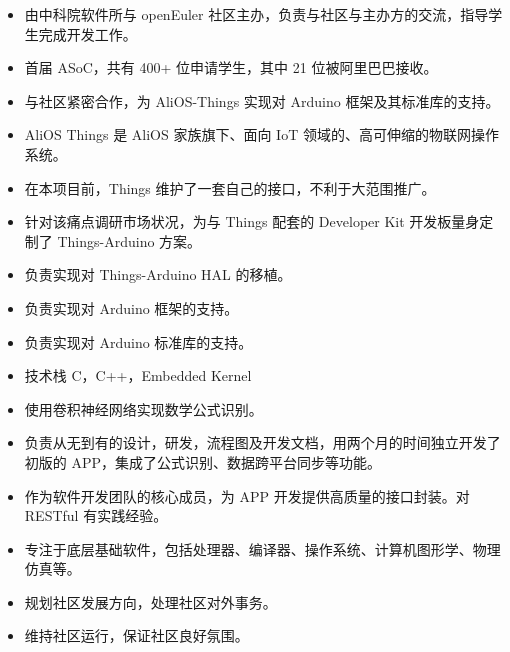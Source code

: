\documentclass{resume}
\begin{document}
\begin{itemize}
  \item 由中科院软件所与 openEuler 社区主办，负责与社区与主办方的交流，指导学生完成开发工作。
\end{itemize}

\continue
\clearpage

\begin{itemize}
  \item 首届 ASoC，共有 400+ 位申请学生，其中 21 位被阿里巴巴接收。
  \item 与社区紧密合作，为 AliOS-Things 实现对 Arduino 框架及其标准库的支持。
  \item AliOS Things 是 AliOS 家族旗下、面向 IoT 领域的、高可伸缩的物联网操作系统。
  \item 在本项目前，Things 维护了一套自己的接口，不利于大范围推广。
  \item 针对该痛点调研市场状况，为与 Things 配套的 Developer Kit 开发板量身定制了 Things-Arduino 方案。
  \item 负责实现对 Things-Arduino HAL 的移植。
  \item 负责实现对 Arduino 框架的支持。
  \item 负责实现对 Arduino 标准库的支持。
  \item 技术栈 C，C++，Embedded Kernel
\end{itemize}

\begin{itemize}
  \item 使用卷积神经网络实现数学公式识别。
  \item 负责从无到有的设计，研发，流程图及开发文档，用两个月的时间独立开发了初版的 APP，集成了公式识别、数据跨平台同步等功能。
  \item 作为软件开发团队的核心成员，为 APP 开发提供高质量的接口封装。对 RESTful 有实践经验。
\end{itemize}

\begin{itemize}
  \item 专注于底层基础软件，包括处理器、编译器、操作系统、计算机图形学、物理仿真等。
  \item 规划社区发展方向，处理社区对外事务。
  \item 维持社区运行，保证社区良好氛围。
\end{itemize}
\end{document}
